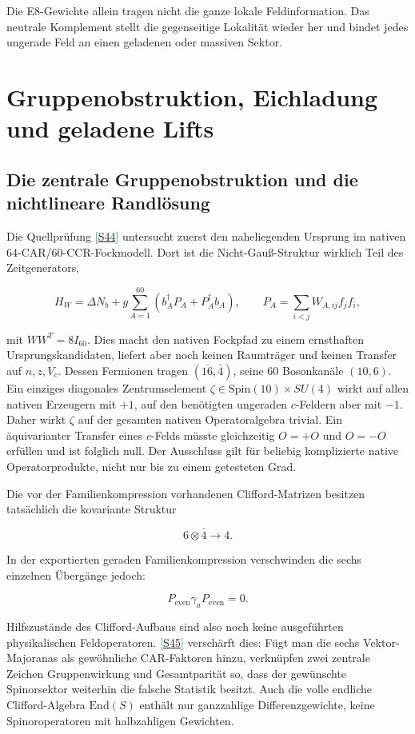 \documentclass[11pt,a4paper,oneside,parskip=half,headings=normal,numbers=noenddot,bibliography=totoc]{scrreprt}
\newcommand{\src}[1]{\textcolor{teal}{\small[\hyperref[s:#1]{S#1}]}}
\newcommand{\finding}[2]{\begin{tcolorbox}[enhanced,breakable,colback=pale,colframe=teal,boxrule=0pt,borderline west={2pt}{0pt}{teal},arc=0mm,left=3mm,right=3mm,top=2mm,bottom=2mm,title={#1},coltitle=ink,colbacktitle=pale,fonttitle=\sffamily\bfseries]#2\end{tcolorbox}}
\begin{document}
\finding{Lokale Statistik liegt im vollständigen Glue}{Die E8-Gewichte allein tragen nicht die ganze lokale Feldinformation. Das neutrale Komplement stellt die gegenseitige Lokalität wieder her und bindet jedes ungerade Feld an einen geladenen oder massiven Sektor.}

\chapter{Gruppenobstruktion, Eichladung und geladene Lifts}
\section{Die zentrale Gruppenobstruktion und die nichtlineare Randlösung}

Die Quellprüfung \src{44} untersucht zuerst den naheliegenden Ursprung im nativen 64-CAR/60-CCR-Fockmodell. Dort ist die Nicht-Gauß-Struktur wirklich Teil des Zeitgenerators,

\[
H_W=\Delta N_b+g\sum_{A=1}^{60}
\left(b_A^\dagger P_A+P_A^\dagger b_A\right),
\qquad P_A=\sum_{i<j}W_{A,ij}f_jf_i,
\]

mit \(WW^T=8I_{60}\). Dies macht den nativen Fockpfad zu einem ernsthaften Ursprungskandidaten, liefert aber noch keinen Raumträger und keinen Transfer auf \(n,z,V_c\). Dessen Fermionen tragen \((\bar{16},\bar4)\), seine 60 Bosonkanäle \((10,6)\). Ein einziges diagonales Zentrumselement \(\zeta\in\mathrm{Spin}(10)\times SU(4)\) wirkt auf allen nativen Erzeugern mit \(+1\), auf den benötigten ungeraden \(c\)-Feldern aber mit \(-1\). Daher wirkt \(\zeta\) auf der gesamten nativen Operatoralgebra trivial. Ein äquivarianter Transfer eines \(c\)-Felds müsste gleichzeitig \(O=+O\) und \(O=-O\) erfüllen und ist folglich null. Der Ausschluss gilt für beliebig komplizierte native Operatorprodukte, nicht nur bis zu einem getesteten Grad.

Die vor der Familienkompression vorhandenen Clifford-Matrizen besitzen tatsächlich die kovariante Struktur

\[
6\otimes\bar4\longrightarrow4.
\]

In der exportierten geraden Familienkompression verschwinden die sechs einzelnen Übergänge jedoch:

\[
P_\mathrm{even}\gamma_aP_\mathrm{even}=0.
\]

Hilfszustände des Clifford-Aufbaus sind also noch keine ausgeführten physikalischen Feldoperatoren. \src{45} verschärft dies: Fügt man die sechs Vektor-Majoranas als gewöhnliche CAR-Faktoren hinzu, verknüpfen zwei zentrale Zeichen Gruppenwirkung und Gesamtparität so, dass der gewünschte Spinorsektor weiterhin die falsche Statistik besitzt. Auch die volle endliche Clifford-Algebra \(\mathrm{End}(S)\) enthält nur ganzzahlige Differenzgewichte, keine Spinoroperatoren mit halbzahligen Gewichten.
\end{document}
